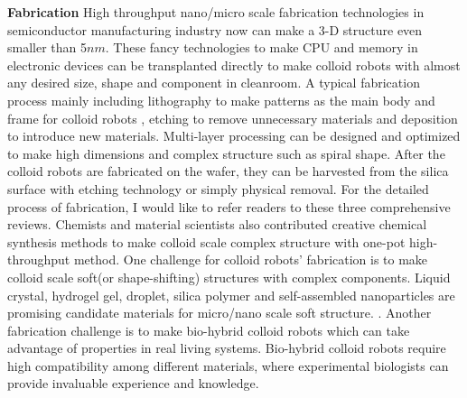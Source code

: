 \textbf{Fabrication}  High throughput nano/micro scale fabrication technologies in semiconductor manufacturing industry now can make a 3-D structure even smaller than 5$nm$.\cite{mokhlesi2010three} These fancy technologies to make CPU and memory in electronic devices can be transplanted directly to make colloid robots with almost any desired size, shape and component in cleanroom.\cite{koman2018colloidal} A typical fabrication process mainly including lithography to make patterns as the main body and frame for colloid robots , etching to remove unnecessary materials and deposition to introduce new materials. Multi-layer processing can be designed and optimized to make high dimensions and complex structure such as spiral shape\cite{zhang2009artificial}. After the colloid robots are fabricated on the wafer, they can be harvested from the silica surface with etching technology or simply physical removal. For the detailed process of fabrication, I would like to refer readers to these three comprehensive reviews\cite{wong2016synthetic,wang2017emerging, zha2018tubular}. Chemists and material scientists also contributed creative chemical synthesis methods to make colloid scale complex structure with one-pot high-throughput method\cite{youssef2016shape,gong2017patchy,wang2019active}. One challenge for colloid robots' fabrication is to   make  colloid scale soft(or shape-shifting) structures with complex components. Liquid crystal, hydrogel gel, droplet, silica polymer and self-assembled nanoparticles are promising candidate materials for micro/nano scale soft structure. \cite{leong2009tetherless,denkov2015self,zhang2017printing,wei2019molecular}. Another fabrication challenge is to make bio-hybrid colloid robots which can take advantage of  properties in real living systems. Bio-hybrid colloid robots require high compatibility  among different materials, where experimental biologists can provide invaluable experience and knowledge.\cite{stanton2016biohybrid,magdanz2013development}

